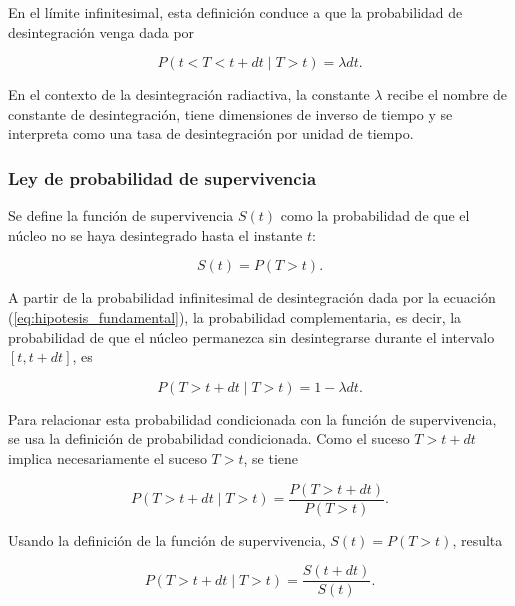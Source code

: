 \documentclass[12pt,a4paper]{article}
\newcommand{\refmargen}[2]{%
  \marginnote{%
    \makebox[\marginparwidth][l]{%
      \parbox[t]{1.7cm}{%
        \scriptsize\raggedright\textbf{#1}\\[-0.2em] #2%
      }%
    }%
  }%
}
\begin{document}
En el límite infinitesimal, esta definición conduce a que la probabilidad de desintegración venga dada por

\begin{equation}
    P(t<T<t+dt \mid T>t)=\lambda dt.
    \label{eq:hipotesis_fundamental}
\end{equation}

En el contexto de la desintegración radiactiva, la constante $\lambda$ recibe el nombre de constante de desintegración, tiene dimensiones de inverso de tiempo y se interpreta como una tasa de desintegración por unidad de tiempo. \refmargen{Krane \cite{krane}}{\S 6.1}


\subsubsection{Ley de probabilidad de supervivencia}

Se define la función de supervivencia $S(t)$ como la probabilidad de que el núcleo no se haya desintegrado hasta el instante $t$:

\begin{equation}
    S(t)=P(T>t).
    \label{eq:def_funcion_supervivencia}
\end{equation}

A partir de la probabilidad infinitesimal de desintegración dada por la ecuación (\ref{eq:hipotesis_fundamental}), la probabilidad complementaria, es decir, la probabilidad de que el núcleo permanezca sin desintegrarse durante el intervalo $[t,t+dt]$, es

\begin{equation}
    P(T>t+dt \mid T>t)=1-\lambda dt.
    \label{eq:supervivencia_intervalo_infinitesimal}
\end{equation}

Para relacionar esta probabilidad condicionada con la función de supervivencia, se usa la definición de probabilidad condicionada. Como el suceso $T>t+dt$ implica necesariamente el suceso $T>t$, se tiene

\begin{equation}
    P(T>t+dt \mid T>t)
    =
    \frac{P(T>t+dt)}{P(T>t)}.
\end{equation}

Usando la definición de la función de supervivencia, $S(t)=P(T>t)$, resulta

\begin{equation}
    P(T>t+dt \mid T>t)
    =
    \frac{S(t+dt)}{S(t)}.
\end{equation}
\end{document}
